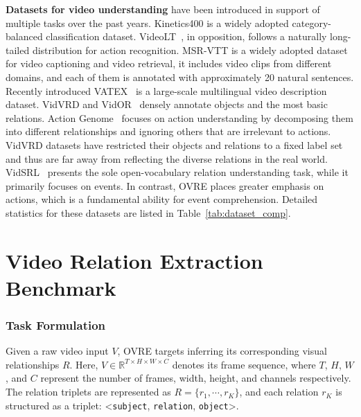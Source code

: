 \documentclass[letterpaper]{article}
\begin{document}
\noindent \textbf{Datasets for video understanding} have been introduced in support of multiple tasks over the past years.
Kinetics400 \cite{Kay2017TheKH} is a widely adopted category-balanced classification dataset. VideoLT~\cite{zhang2021videolt}, in opposition, follows a naturally long-tailed distribution for action recognition.
MSR-VTT \cite{7780940} is a widely adopted dataset for video captioning and video retrieval, it includes video clips from different domains, and each of them is annotated with approximately 20 natural sentences. Recently introduced VATEX~\cite{wang2019vatex} is a large-scale multilingual video description dataset.
VidVRD \cite{Shang2017VideoVR} and VidOR~\cite{shang2019annotating} densely annotate objects and the most basic relations.
Action Genome~\cite{genome} focuses on action understanding by decomposing them into different relationships and ignoring others that are irrelevant to actions.
VidVRD datasets have restricted their objects and relations to a fixed label set and thus are far away from reflecting the diverse relations in the real world.
VidSRL~\cite{sadhu2021visual} presents the sole open-vocabulary relation understanding task, while it primarily focuses on events. In contrast, OVRE places greater emphasis on actions, which is a fundamental ability for event comprehension.
Detailed statistics for these datasets are listed in Table~\ref{tab:dataset_comp}.







\section{Video Relation Extraction Benchmark}
\subsubsection{Task Formulation}
Given a raw video input $V$, OVRE targets inferring its corresponding visual relationships $R$. Here, $V\in\mathbb{R}^{T\times H\times W\times C}$ denotes its frame sequence, where $T$, $H$, $W$, and $C$ represent the number of frames, width, height, and channels respectively. The relation triplets are represented as $R=\{{r_{1}},\cdots,{r_{K}}\}$, and each relation $r_{K}$ is structured as a triplet:  \textless \texttt{subject}, \texttt{relation}, \texttt{object}\textgreater.
\end{document}
